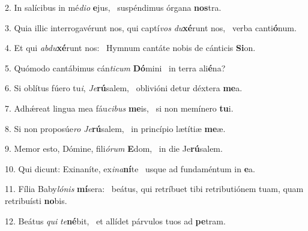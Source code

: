 2. In salícibus in mé\textit{di}\textit{o} \textbf{e}jus, \ast\  suspéndimus órgana \textbf{nos}tra.\

3. Quia illic interrogavérunt nos, qui captí\textit{vos} \textit{du}\textbf{xé}runt nos, \ast\  verba canti\textbf{ó}num.\

4. Et qui \textit{ab}\textit{du}\textbf{xé}runt nos: \ast\  Hymnum cantáte nobis de cánticis \textbf{Si}on.\

5. Quómodo cantábimus cán\textit{ti}\textit{cum} \textbf{Dó}mini \ast\  in terra ali\textbf{é}na?\

6. Si oblítus fúero tu\textit{i}, \textit{Je}\textbf{rú}salem, \ast\  oblivióni detur déxtera \textbf{me}a.\

7. Adhǽreat lingua mea fáu\textit{ci}\textit{bus} \textbf{me}is, \ast\  si non memínero \textbf{tu}i.\

8. Si non proposúe\textit{ro} \textit{Je}\textbf{rú}salem, \ast\  in princípio lætítiæ \textbf{me}æ.\

9. Memor esto, Dómine, fili\textit{ó}\textit{rum} \textbf{E}dom, \ast\  in die Je\textbf{rú}salem.\

10. Qui dicunt: Exinaníte, ex\textit{i}\textit{na}\textbf{ní}te \ast\  usque ad fundaméntum in \textbf{e}a.\

11. Fília Baby\textit{ló}\textit{nis} \textbf{mí}sera: \ast\  beátus, qui retríbuet tibi retributiónem tuam, quam retribuísti \textbf{no}bis.\

12. Beátus \textit{qui} \textit{te}\textbf{né}bit, \ast\  et allídet párvulos tuos ad \textbf{pe}tram.\

